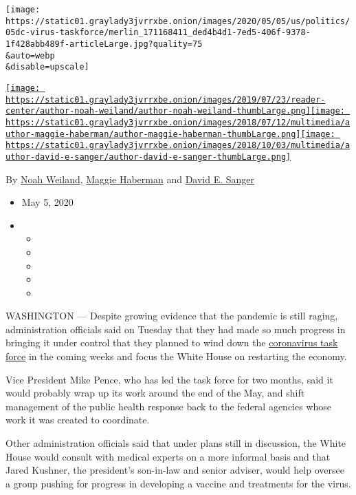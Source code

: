 \texttt{[image: https://static01.graylady3jvrrxbe.onion/images/2020/05/05/us/politics/05dc-virus-taskforce/merlin\_171168411\_ded4b4d1-7ed5-406f-9378-1f428abb489f-articleLarge.jpg?quality=75\\\&auto=webp\\\&disable=upscale]}

\href{https://www.nytimes3xbfgragh.onion/by/noah-weiland}{\texttt{[image: https://static01.graylady3jvrrxbe.onion/images/2019/07/23/reader-center/author-noah-weiland/author-noah-weiland-thumbLarge.png]}}\href{https://www.nytimes3xbfgragh.onion/by/maggie-haberman}{\texttt{[image: https://static01.graylady3jvrrxbe.onion/images/2018/07/12/multimedia/author-maggie-haberman/author-maggie-haberman-thumbLarge.png]}}\href{https://www.nytimes3xbfgragh.onion/by/david-e-sanger}{\texttt{[image: https://static01.graylady3jvrrxbe.onion/images/2018/10/03/multimedia/author-david-e-sanger/author-david-e-sanger-thumbLarge.png]}}

By \href{https://www.nytimes3xbfgragh.onion/by/noah-weiland}{Noah
Weiland},
\href{https://www.nytimes3xbfgragh.onion/by/maggie-haberman}{Maggie
Haberman} and
\href{https://www.nytimes3xbfgragh.onion/by/david-e-sanger}{David E.
Sanger}

\begin{itemize}
\item
  May 5, 2020
\item
  \begin{itemize}
  \item
  \item
  \item
  \item
  \item
  \end{itemize}
\end{itemize}

WASHINGTON --- Despite growing evidence that the pandemic is still
raging, administration officials said on Tuesday that they had made so
much progress in bringing it under control that they planned to wind
down the
\href{https://www.nytimes3xbfgragh.onion/2020/05/07/us/politics/coronavirus-task-force-trump.html}{coronavirus
task force} in the coming weeks and focus the White House on restarting
the economy.

Vice President Mike Pence, who has led the task force for two months,
said it would probably wrap up its work around the end of the May, and
shift management of the public health response back to the federal
agencies whose work it was created to coordinate.

Other administration officials said that under plans still in
discussion, the White House would consult with medical experts on a more
informal basis and that Jared Kushner, the president's son-in-law and
senior adviser, would help oversee a group pushing for progress in
developing a vaccine and treatments for the virus.

